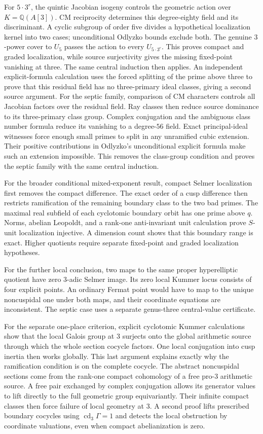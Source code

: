 \documentclass[11pt]{article}
\newcommand{\Q}{\mathbb Q}
\theoremstyle{definition}
\begin{document}
For $5\cdot3^r$, the quintic Jacobian isogeny controls the geometric
action over $K=\Q(A[3])$. CM reciprocity determines this degree-eighty
field and its discriminant. A cyclic subgroup of order five divides
a hypothetical localization kernel into two cases; unconditional
Odlyzko bounds exclude both. The genuine $3$-power cover to $U_5$
passes the action to every $U_{5\cdot3^r}$. This proves compact and
graded localization, while source surjectivity gives the missing
fixed-point vanishing at three. The same central induction then applies.
An independent explicit-formula calculation uses the forced splitting
of the prime above three to prove that this residual field has no
three-primary ideal classes, giving a second source argument.
For the septic family, comparison of CM characters controls all
Jacobian factors over the residual field. Ray classes then reduce
source dominance to its three-primary class group. Complex conjugation
and the ambiguous class number formula reduce its vanishing to a
degree-$56$ field. Exact principal-ideal witnesses force enough small
primes to split in any unramified cubic extension. Their positive
contributions in Odlyzko's unconditional explicit formula make such
an extension impossible. This removes the class-group condition and
proves the septic family with the same central induction.

For the broader conditional mixed-exponent result, compact Selmer localization
first removes the compact difference. The exact order of a cusp
difference then restricts ramification of the remaining boundary
class to the two bad primes. The maximal real subfield of each
cyclotomic boundary orbit has one prime above $q$. Norms, abelian
Leopoldt, and a rank-one anti-invariant unit calculation prove
$S$-unit localization injective. A dimension count shows that this
boundary range is exact. Higher quotients require
separate fixed-point and graded localization hypotheses.

For the further local conclusion, two maps to the same proper
hyperelliptic quotient have zero $3$-adic Selmer image. Its zero
local Kummer locus consists of four explicit points. An ordinary
Fermat point would have to map to the unique noncuspidal one under
both maps, and their coordinate equations are inconsistent. The
septic case uses a separate genus-three central-value certificate.

For the separate one-place criterion, explicit cyclotomic Kummer
calculations show that the local Galois group at $3$ surjects onto the
global arithmetic source through which the whole section cocycle
factors. One local conjugation into cusp inertia then works globally.
This last argument explains exactly why the ramification condition is
on the complete cocycle.
The abstract noncuspidal sections come from the rank-one compact
cohomology of a free pro-$3$ arithmetic source. A free pair exchanged
by complex conjugation allows its generator values to lift directly
to the full geometric group equivariantly. Their
infinite compact classes then force failure of local geometry at $3$.
A second proof lifts prescribed boundary cocycles using
$\operatorname{cd}_3\Gamma=1$ and detects the local obstruction by
coordinate valuations, even when compact abelianization is zero.
\end{document}
